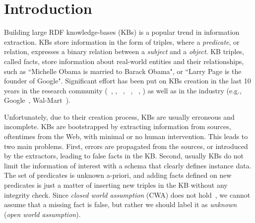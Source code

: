 \section{Introduction}

Building large RDF knowledge-bases (KBs) is a popular trend in information extraction.
KBs store information in the form of triples, where a \emph{predicate}, or relation, expresses a binary relation between a \emph{subject} and a \emph{object}. KB triples, called facts, store information about real-world entities and their relationships, such as %
``Michelle Obama is married to Barack Obama", or ``Larry Page is the founder of Google".
Significant effort has been put on KBs creation in the last 10 years in the research community (~\cite{bizer2009dbpedia}, \cite{bollacker2008freebase}, ~\cite{vrandevcic2014wikidata}, \deepdive~\cite{shin2015incremental}, ~\cite{suchanek2007yago}, 
\cite{banko2007open}) as well as in the industry %
(e.g., 
Google~\cite{dong2014data}, Wal-Mart~\cite{deshpande2013building}).

Unfortunately, due to their creation process, KBs are usually erroneous and incomplete.
KBs are bootstrapped by extracting information from sources, oftentimes from the Web, with minimal or no human intervention.  This leads to two main problems. First, errors are propagated from the sources, or introduced by the extractors, leading to false facts in the KB. Second, usually KBs do not limit the information of interest with a schema that clearly defines instance data. The set of predicates is unknown a-priori, and adding facts defined on new predicates is just a matter of inserting new triples in the KB without any integrity check.  
Since \emph{closed world assumption} (CWA) does not hold~\cite{dong2014data,galarraga2015fast}, we cannot assume that a missing fact is false, but rather we should label it as \emph{unknown} (\emph{open world assumption}).


